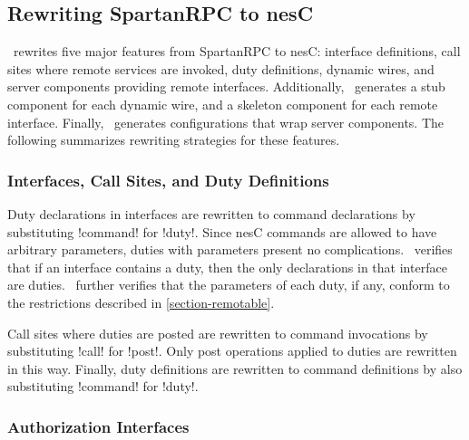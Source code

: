 \subsection{Rewriting SpartanRPC to nesC}

\Sprocket\ rewrites five major features from SpartanRPC to nesC: interface definitions, call
sites where remote services are invoked, duty definitions, dynamic wires, and server components
providing remote interfaces. Additionally, \Sprocket\ generates a stub component for each
dynamic wire, and a skeleton component for each remote interface. Finally, \Sprocket\ generates
configurations that wrap server components. The following summarizes rewriting strategies for
these features.


\subsubsection{Interfaces, Call Sites, and Duty Definitions}

Duty declarations in interfaces are rewritten to command declarations by substituting !command!
for !duty!. Since nesC commands are allowed to have arbitrary parameters, duties with parameters
present no complications. \Sprocket\ verifies that if an interface contains a duty, then the
only declarations in that interface are duties. \Sprocket\ further verifies that the parameters
of each duty, if any, conform to the restrictions described in \autoref{section-remotable}.


Call sites where duties are posted are rewritten to command invocations by substituting !call!
for !post!. Only post operations applied to duties are rewritten in this way. Finally, duty
definitions are rewritten to command definitions by also substituting !command! for !duty!.

\subsubsection{Authorization Interfaces}

